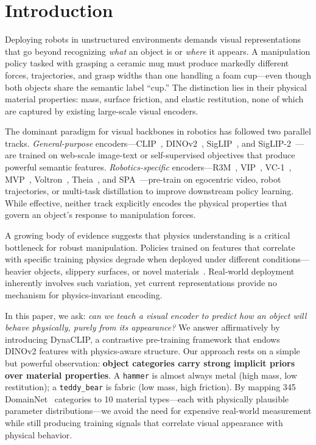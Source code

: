 \documentclass{article}
\newcommand{\methodname}{DynaCLIP}
\begin{document}
\section{Introduction}
\label{sec:intro}

Deploying robots in unstructured environments demands visual representations that go beyond recognizing \emph{what} an object is or \emph{where} it appears. A manipulation policy tasked with grasping a ceramic mug must produce markedly different forces, trajectories, and grasp widths than one handling a foam cup---even though both objects share the semantic label ``cup.'' The distinction lies in their physical material properties: mass, surface friction, and elastic restitution, none of which are captured by existing large-scale visual encoders.

The dominant paradigm for visual backbones in robotics has followed two parallel tracks. \emph{General-purpose} encoders---CLIP~\cite{radford2021clip}, DINOv2~\cite{oquab2024dinov2}, SigLIP~\cite{zhai2023siglip}, and SigLIP-2~\cite{tschannen2025siglip2}---are trained on web-scale image-text or self-supervised objectives that produce powerful semantic features. \emph{Robotics-specific} encoders---R3M~\cite{nair2022r3m}, VIP~\cite{ma2022vip}, VC-1~\cite{radosavovic2023vc1}, MVP~\cite{xiao2022mvp}, Voltron~\cite{karamcheti2023voltron}, Theia~\cite{shang2024theia}, and SPA~\cite{sun2024spa}---pre-train on egocentric video, robot trajectories, or multi-task distillation to improve downstream policy learning. While effective, neither track explicitly encodes the physical properties that govern an object's response to manipulation forces.

A growing body of evidence suggests that physics understanding is a critical bottleneck for robust manipulation. Policies trained on features that correlate with specific training physics degrade when deployed under different conditions---heavier objects, slippery surfaces, or novel materials~\cite{li2024evaluating,ze2024generalizable}. Real-world deployment inherently involves such variation, yet current representations provide no mechanism for physics-invariant encoding.

In this paper, we ask: \emph{can we teach a visual encoder to predict how an object will behave physically, purely from its appearance?} We answer affirmatively by introducing \methodname{}, a contrastive pre-training framework that endows DINOv2 features with physics-aware structure. Our approach rests on a simple but powerful observation: \textbf{object categories carry strong implicit priors over material properties}. A \texttt{hammer} is almost always metal (high mass, low restitution); a \texttt{teddy\_bear} is fabric (low mass, high friction). By mapping 345 DomainNet~\cite{peng2019domainnet} categories to 10 material types---each with physically plausible parameter distributions---we avoid the need for expensive real-world measurement while still producing training signals that correlate visual appearance with physical behavior.
\end{document}

